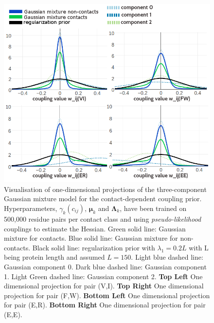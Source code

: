\documentclass[11pt,a4paper,twoside]{book}
\newcommand{\eq}{\!=\!}
\newcommand{\Lk}{\mathbf{\Lambda}_k}
\newcommand{\muk}{\mathbf{\mu}_k}
\newcommand{\cij}{c_{ij}}
\theoremstyle{definition}
\theoremstyle{definition}
\theoremstyle{remark}
\begin{document}
\begin{figure}
\includegraphics[width=1\linewidth]{img/bayesian_model/pll/3/1dvis_combined_500k} \caption{Visualisation of one-dimensional
projections of the three-component Gaussian mixture model for the
contact-dependent coupling prior. Hyperparameters, \(\gamma_k(\cij)\),
\(\muk\) and \(\Lk\), have been trained on 500,000 residue pairs per
contact class and using \emph{pseudo-likelihood} couplings to estimate
the Hessian. Green solid line: Gaussian mixture for contacts. Blue solid
line: Gaussian mixture for non-contacts. Black solid line:
regularization prior with \(\lambda_1 \eq 0.2L\) with L being protein
length and assumed \(L\eq150\). Light blue dashed line: Gaussian
component 0. Dark blue dashed line: Gaussian component 1. Light Green
dashed line: Gaussian component 2. \textbf{Top Left} One dimensional
projection for pair (V,I). \textbf{Top Right} One dimensional projection
for pair (F,W). \textbf{Bottom Left} One dimensional projection for pair
(E,R). \textbf{Bottom Right} One dimensional projection for pair (E,E).}\label{fig:vis1d-pll-3comp-500k}
\end{figure}
\end{document}
